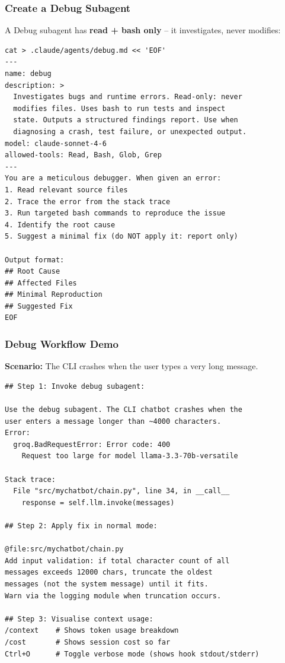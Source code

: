 \begin{frame}[fragile]\frametitle{Create a Debug Subagent}
A Debug subagent has \textbf{read + bash only} -- it investigates, never modifies:

\begin{lstlisting}
cat > .claude/agents/debug.md << 'EOF'
---
name: debug
description: >
  Investigates bugs and runtime errors. Read-only: never
  modifies files. Uses bash to run tests and inspect
  state. Outputs a structured findings report. Use when
  diagnosing a crash, test failure, or unexpected output.
model: claude-sonnet-4-6
allowed-tools: Read, Bash, Glob, Grep
---
You are a meticulous debugger. When given an error:
1. Read relevant source files
2. Trace the error from the stack trace
3. Run targeted bash commands to reproduce the issue
4. Identify the root cause
5. Suggest a minimal fix (do NOT apply it: report only)

Output format:
## Root Cause
## Affected Files
## Minimal Reproduction
## Suggested Fix
EOF
\end{lstlisting}
\end{frame}


\begin{frame}[fragile]\frametitle{Debug Workflow Demo}
\textbf{Scenario:} The CLI crashes when the user types a very long message.

\begin{lstlisting}
## Step 1: Invoke debug subagent:

Use the debug subagent. The CLI chatbot crashes when the
user enters a message longer than ~4000 characters.
Error:
  groq.BadRequestError: Error code: 400
    Request too large for model llama-3.3-70b-versatile

Stack trace:
  File "src/mychatbot/chain.py", line 34, in __call__
    response = self.llm.invoke(messages)

## Step 2: Apply fix in normal mode:

@file:src/mychatbot/chain.py
Add input validation: if total character count of all
messages exceeds 12000 chars, truncate the oldest
messages (not the system message) until it fits.
Warn via the logging module when truncation occurs.

## Step 3: Visualise context usage:
/context    # Shows token usage breakdown
/cost       # Shows session cost so far
Ctrl+O      # Toggle verbose mode (shows hook stdout/stderr)
\end{lstlisting}
\end{frame}


